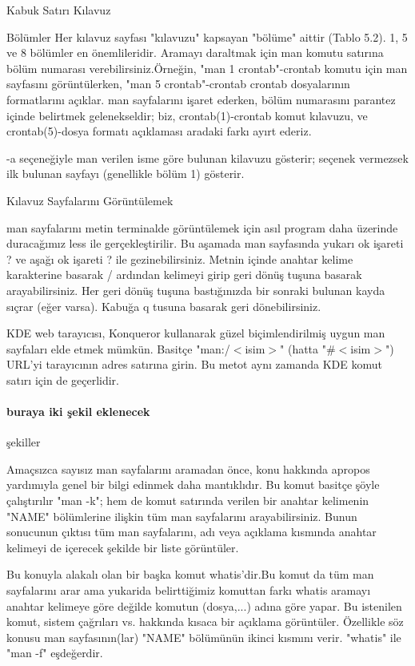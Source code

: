 \documentclass[10pt,a5paper]{book}
\begin{document}
\begin{section}{Kabuk Satırı Kılavuz}
\begin{subsection}{Bölümler}
Her kılavuz sayfası "kılavuzu" kapsayan "bölüme" aittir (Tablo 5.2). 1, 5 ve 8 bölümler en önemlileridir. Aramayı daraltmak için man komutu satırına bölüm numarası verebilirsiniz.Örneğin, "man 1 crontab"-crontab komutu için man sayfasını görüntülerken, "man 5 crontab"-crontab crontab dosyalarının formatlarını açıklar. man sayfalarını işaret ederken, bölüm numarasını parantez içinde belirtmek gelenekseldir; biz, crontab(1)-crontab komut kılavuzu, ve crontab(5)-dosya formatı açıklaması aradaki farkı ayırt ederiz.

-a seçeneğiyle man verilen isme göre bulunan kilavuzu gösterir; seçenek vermezsek ilk bulunan sayfayı (genellikle bölüm 1) gösterir.
\end{subsection}
\begin{subsection}{Kılavuz Sayfalarını Görüntülemek }

man sayfalarını metin terminalde görüntülemek için asıl program daha üzerinde duracağımız less ile gerçekleştirilir. Bu aşamada man sayfasında yukarı ok işareti ? ve aşağı ok işareti ? ile gezinebilirsiniz. Metnin içinde anahtar kelime karakterine basarak / ardından kelimeyi girip geri dönüş tuşuna basarak arayabilirsiniz. Her geri dönüş tuşuna bastığınızda bir sonraki bulunan kayda sıçrar (eğer varsa). Kabuğa q tusuna basarak geri dönebilirsiniz.

KDE web tarayıcısı, Konqueror kullanarak güzel biçimlendirilmiş uygun man sayfaları elde etmek mümkün. Basitçe "man:/$<$isim$>$" (hatta "\#$<$isim$>$") URL'yi tarayıcının adres satırına girin. Bu metot aynı zamanda KDE komut satırı için de geçerlidir.

\paragraph{buraya iki şekil eklenecek}{şekiller}

Amaçsızca sayısız man sayfalarını aramadan önce, konu hakkında apropos yardımıyla genel bir bilgi edinmek daha mantıklıdır. Bu komut basitçe şöyle çalıştırılır "man -k"; hem de komut satırında verilen bir anahtar kelimenin "NAME" bölümlerine ilişkin tüm man sayfalarını arayabilirsiniz. Bunun sonucunun çıktısı tüm man sayfalarını, adı veya açıklama kısmında anahtar kelimeyi de içerecek şekilde bir liste görüntüler.

Bu konuyla alakalı olan bir başka komut whatis'dir.Bu komut da tüm man sayfalarını arar ama yukarida belirttiğimiz komuttan farkı whatis aramayı anahtar kelimeye göre değilde komutun (dosya,...) adına göre yapar. Bu istenilen komut, sistem çağrıları vs. hakkında kısaca bir açıklama görüntüler. Özellikle söz konusu man sayfasının(lar) "NAME" bölümünün ikinci  kısmını verir. "whatis" ile "man -f" eşdeğerdir.

\end{subsection}
\end{section}
\end{document}
